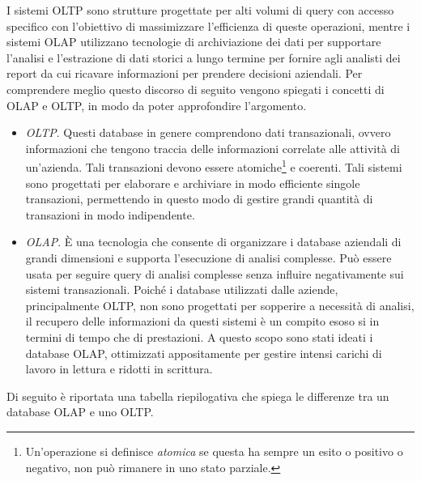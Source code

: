 I sistemi OLTP sono strutture progettate per alti volumi di query con accesso specifico con l'obiettivo di massimizzare l'efficienza di queste operazioni, mentre i sistemi OLAP utilizzano tecnologie di archiviazione dei dati per supportare l'analisi e l'estrazione di dati storici a lungo termine per fornire agli analisti dei report da cui ricavare informazioni per prendere decisioni aziendali.\cite{ieee_oltp_olap}
Per comprendere meglio questo discorso di seguito vengono spiegati i concetti di OLAP e OLTP, in modo da poter approfondire l'argomento.

\begin{itemize}
    \item \textit{OLTP}. Questi database in genere comprendono dati transazionali, ovvero informazioni che tengono traccia delle informazioni correlate alle attività di un'azienda. Tali transazioni devono essere atomiche\footnote{Un'operazione si definisce \textit{atomica} se questa ha sempre un esito o positivo o negativo, non può rimanere in uno stato parziale.} e coerenti. Tali sistemi sono progettati per elaborare e archiviare in modo efficiente singole transazioni, permettendo in questo modo di gestire grandi quantità di transazioni in modo indipendente.\cite{microsoft_oltp}
    \item \textit{OLAP}. È una tecnologia che consente di organizzare i database aziendali di grandi dimensioni e supporta l'esecuzione di analisi complesse. Può essere usata per seguire query di analisi complesse senza influire negativamente sui sistemi transazionali. Poiché i database utilizzati dalle aziende, principalmente OLTP, non sono progettati per sopperire a necessità di analisi, il recupero delle informazioni da questi sistemi è un compito esoso si in termini di tempo che di prestazioni. A questo scopo sono stati ideati i database OLAP, ottimizzati appositamente per gestire intensi carichi di lavoro in lettura e ridotti in scrittura.\cite{microsoft_olap}
\end{itemize}

Di seguito è riportata una tabella riepilogativa che spiega le differenze tra un database OLAP e uno OLTP.\cite{aws_oltp_vs_olap}

